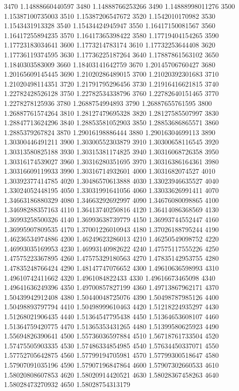 {3470 1.14888660440597
3480 1.14888766253266
3490 1.14888998011276
3500 1.15387100735003
3510 1.15387206547672
3520 1.1542010170982
3530 1.1543431913328
3540 1.15434424945947
3550 1.16417150081567
3560 1.16417255894235
3570 1.16417365398422
3580 1.17719404154265
3590 1.17723183034641
3600 1.1773214783174
3610 1.17732253644408
3620 1.17736119374595
3630 1.17736225187264
3640 1.17887861563102
3650 1.1840303583009
3660 1.18403141642759
3670 1.20145706760427
3680 1.20165609145445
3690 1.21020286489015
3700 1.21020392301683
3710 1.21020498114351
3720 1.21791795296456
3730 1.21916416621815
3740 1.22782428526128
3750 1.22782534338796
3760 1.22782640151465
3770 1.2278278125936
3780 1.2688754994893
3790 1.26887655761595
3800 1.26887761574264
3810 1.28127479695328
3820 1.28127585507997
3830 1.28847713624296
3840 1.28853581052903
3850 1.28853686865571
3860 1.2885379267824
3870 1.29016198886444
3880 1.29016304699113
3890 1.30300446491211
3900 1.30300552303879
3910 1.30300658116545
3920 1.30313580825188
3930 1.30315381174825
3940 1.30316068726358
3950 1.30316174539027
3960 1.30316280351695
3970 1.30316386164361
3980 1.30316609119933
3990 1.30316714932601
4000 1.3031682074527
4010 1.30392377414785
4020 1.30486570613888
4030 1.33023946635527
4040 1.33024052448195
4050 1.33031991641056
4060 1.33033626991411
4070 1.34663186880329
4080 1.34663292692997
4090 1.34676080098865
4100 1.34698288357163
4110 1.36413740250816
4120 1.36414086368569
4130 1.36993258500326
4140 1.36993638739779
4150 1.36993744552447
4160 1.36995907809535
4170 1.37001226010943
4180 1.37026188795244
4190 1.46236534974886
4200 1.46249623286013
4210 1.46250549098752
4220 1.46993035169953
4230 1.46993140982622
4240 1.47575117555226
4250 1.47575223367895
4260 1.47575329180563
4270 1.47835142953755
4280 1.47835248766424
4290 1.48147747076652
4300 1.49610636598993
4310 1.49610742411662
4320 1.4961084822433
4330 1.49616673465098
4340 1.49641636249396
4350 1.49700857827199
4360 1.49713867962171
4370 1.50439942912408
4380 1.50440048725076
4390 1.50498787985126
4400 1.50498893797794
4410 1.50498999610463
4420 1.51218224935297
4430 1.51268021906435
4440 1.51364547795438
4450 1.51364653608107
4460 1.51364759420775
4470 1.51365353431265
4480 1.51399580625923
4490 1.55694826390641
4500 1.55736036597884
4510 1.56718761733504
4520 1.57475505903335
4530 1.57486334854985
4540 1.57634450337071
4550 1.57752705642875
4560 1.57799194705981
4570 1.57799300518647
4580 1.57907091035196
4590 1.57907196847864
4600 1.57907302660533
4610 1.58020808607853
4620 1.58020914420521
4630 1.58028367458263
4640 1.58028473270932
4650 1.58028754313179
}
